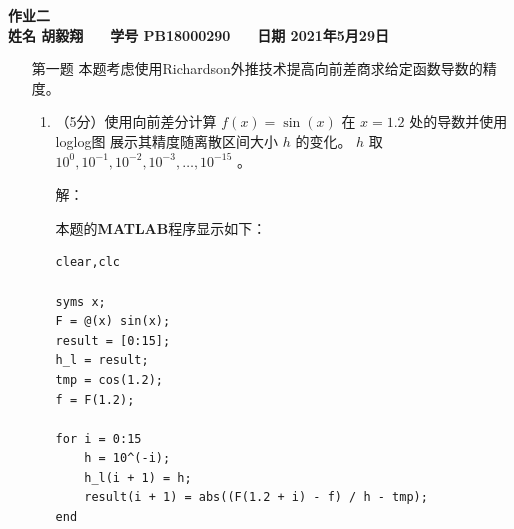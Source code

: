 \documentclass[12pt,a4paper,UTF8]{ctexart}
\theoremstyle{nonumberplain}
\begin{document}


\begin{center}
    \textbf{作业二}\\
    \textbf{姓名 胡毅翔 ~~ 学号 PB18000290 ~~ 日期 2021年5月29日}\\
\end{center}

\begin{center}
    \fbox{
        \begin{minipage}{40em}
            \vspace{5cm}
            \hspace{20cm}
        \end{minipage}}
\end{center}
\vspace{1cm}

\begin{enumerate}
    \item[第一题] 本题考虑使用Richardson外推技术提高向前差商求给定函数导数的精度。
    \begin{enumerate}\item  （5分）使用向前差分计算 $f(x)=\sin (x)$ 在 $x=1.2$ 处的导数并使用loglog图 展示其精度随离散区间大小 $h$ 的变化。 $h$ 取 $10^{0}, 10^{-1}, 10^{-2}, 10^{-3}, \ldots, 10^{-15}$ 。
    \par 解：
    \par 本题的\textbf{MATLAB}程序显示如下：
    \begin{lstlisting}[frame=single]
clear,clc

syms x;
F = @(x) sin(x);
result = [0:15];
h_l = result;
tmp = cos(1.2);
f = F(1.2);

for i = 0:15
    h = 10^(-i);
    h_l(i + 1) = h;
    result(i + 1) = abs((F(1.2 + i) - f) / h - tmp);
end


\end{lstlisting}
\end{enumerate}
\end{enumerate}
\end{document}
